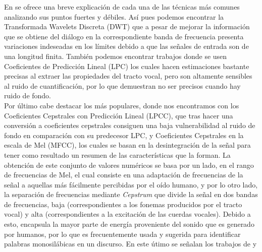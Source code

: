 \documentclass[11pt,a4paper,spanish]{book}
\begin{document}

	
	En \cite{Rashid2018} se ofrece una breve explicación de cada una de las técnicas más comunes analizando sus puntos fuertes y débiles. Así pues podemos encontrar la Transformada Wavelets Discreta (DWT) que a pesar de mejorar la información que se obtiene del diálogo en la correspondiente banda de frecuencia presenta variaciones indeseadas en los límites debido a que las señales de entrada son de una longitud finita. También podemos encontrar trabajos donde se usen Coeficientes de Predicción Lineal (LPC) los cuales hacen estimaciones bastante precisas al extraer las propiedades del tracto vocal, pero son altamente sensibles al ruido de cuantificación, por lo que demuestran no ser precisos cuando hay ruido de fondo. \\
	Por último cabe destacar los más populares, donde nos encontramos con los Coeficientes Cepstrales con Predicción Lineal (LPCC), que tras hacer una conversión a coeficientes cepstrales consiguen una baja vulnerabilidad al ruido de fondo en comparación con su predecesor LPC, y Coeficientes Cepstrales en la escala de Mel (MFCC), los cuales se basan en la desintegración de la señal para tener como resultado un resumen de las características que la forman. La obtención de este conjunto de valores numéricos se basa por un lado, en el rango de frecuencias de Mel, el cual consiste en una adaptación de frecuencias de la señal a aquellas más fácilmente percibidas por el oído humano, y por lo otro lado, la separación de frecuencias mediante \emph{Cepstrum} que divide la señal en dos bandas de frecuencias, baja (correspondientes a los fonemas producidos por el tracto vocal) y alta (correspondientes a la excitación de las cuerdas vocales). Debido a esto, encapsula la mayor parte de energía proveniente del sonido que es generado por humanos, por lo que es frecuentemente usada y sugerida para identificar palabras monosilábicas en un discurso. En este útimo se señalan los trabajos de \cite{Langari2020} y \cite{AbdulQayyum2019}	
	
\end{document}
